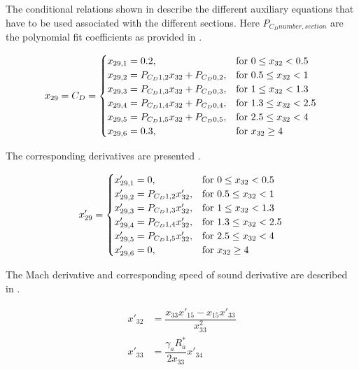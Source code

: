 The conditional relations shown in  describe the different auxiliary equations that have to be used associated with the different sections. Here $P_{C_{D} number,section}$ are the polynomial fit coefficients as provided in .

\begin{equation}\label{eq:cdCond}
x_{29}=C_{D}=\begin{cases}
x_{29,1}=0.2, & \text{for } 0\leq x_{32} < 0.5\\
x_{29,2}=P_{C_{D} 1,2}x_{32}+P_{C_{D} 0,2}, &  \text{for } 0.5\leq x_{32} < 1 \\
x_{29,3}=P_{C_{D} 1,3}x_{32}+P_{C_{D} 0,3}, &  \text{for } 1\leq x_{32} < 1.3 \\
x_{29,4}=P_{C_{D} 1,4}x_{32}+P_{C_{D} 0,4}, &  \text{for } 1.3\leq x_{32} < 2.5 \\
x_{29,5}=P_{C_{D} 1,5}x_{32}+P_{C_{D} 0,5}, &  \text{for } 2.5\leq x_{32} < 4 \\
x_{29,6}=0.3, &  \text{for } x_{32} \geq 4 
\end{cases}\\
\end{equation}

The corresponding derivatives are presented .

\begin{equation}\label{eq:cdCondDer}
x'_{29}=\begin{cases}
x'_{29,1}=0, & \text{for } 0\leq x_{32} < 0.5\\
x'_{29,2}=P_{C_{D} 1,2}x'_{32}, &  \text{for } 0.5\leq x_{32} < 1 \\
x'_{29,3}=P_{C_{D} 1,3}x'_{32}, &  \text{for } 1\leq x_{32} < 1.3 \\
x'_{29,4}=P_{C_{D} 1,4}x'_{32}, &  \text{for } 1.3\leq x_{32} < 2.5 \\
x'_{29,5}=P_{C_{D} 1,5}x'_{32}, &  \text{for } 2.5\leq x_{32} < 4 \\
x'_{29,6}=0, &  \text{for } x_{32} \geq 4 
\end{cases}\\
\end{equation}

The Mach derivative and corresponding speed of sound derivative are described in .

 \begin{equation} \label{eq:cdDerAux}
\begin{split}
x'_{32} &= \dfrac{x_{33}x'_{15}-x_{15}x'_{33}}{x_{33}^{2}}\\
x'_{33} &= \dfrac{\gamma_{a}R_{a}^{*}}{2x_{33}}x'_{34} 
\end{split}
\end{equation}

